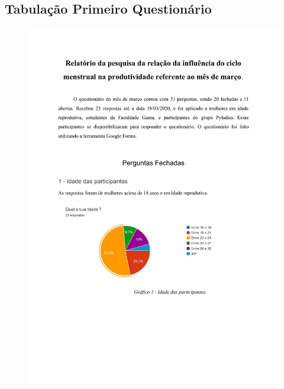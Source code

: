 \begin{apendicesenv}

\partapendices

\chapter{Tabulação Primeiro Questionário}
 
    \begin{figure}[h]
        \centering
        \includegraphics[keepaspectratio=true,scale=0.6]{figuras/Tab.pdf}
    \end{figure}
    

\end{apendicesenv}
